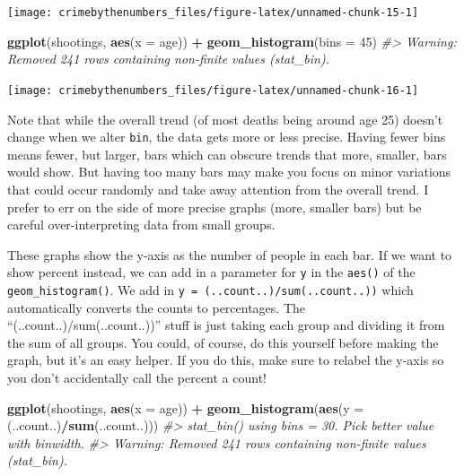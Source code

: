 \documentclass[
  12pt,
]{book}
\newenvironment{Shaded}{\begin{snugshade}}{\end{snugshade}}
\newcommand{\CommentTok}[1]{\textcolor[rgb]{0.37,0.37,0.37}{\textit{#1}}}
\newcommand{\DataTypeTok}[1]{\textcolor[rgb]{0.27,0.27,0.27}{#1}}
\newcommand{\DecValTok}[1]{\textcolor[rgb]{0.06,0.06,0.06}{#1}}
\newcommand{\KeywordTok}[1]{\textcolor[rgb]{0.27,0.27,0.27}{\textbf{#1}}}
\newcommand{\NormalTok}[1]{#1}
\newcommand{\OperatorTok}[1]{\textcolor[rgb]{0.43,0.43,0.43}{\textbf{#1}}}
\newcommand{\StringTok}[1]{\textcolor[rgb]{0.5,0.5,0.5}{#1}}
\begin{document}
\begin{center}\texttt{[image: crimebythenumbers\_files/figure-latex/unnamed-chunk-15-1]} \end{center}

\begin{Shaded}
\begin{Highlighting}[]
\KeywordTok{ggplot}\NormalTok{(shootings, }\KeywordTok{aes}\NormalTok{(}\DataTypeTok{x =}\NormalTok{ age)) }\OperatorTok{+}\StringTok{ }
\StringTok{  }\KeywordTok{geom\_histogram}\NormalTok{(}\DataTypeTok{bins =} \DecValTok{45}\NormalTok{)}
\CommentTok{\#> Warning: Removed 241 rows containing non{-}finite values (stat\_bin).}
\end{Highlighting}
\end{Shaded}

\begin{center}\texttt{[image: crimebythenumbers\_files/figure-latex/unnamed-chunk-16-1]} \end{center}

Note that while the overall trend (of most deaths being around age 25) doesn't change when we alter \texttt{bin}, the data gets more or less precise. Having fewer bins means fewer, but larger, bars which can obscure trends that more, smaller, bars would show. But having too many bars may make you focus on minor variations that could occur randomly and take away attention from the overall trend. I prefer to err on the side of more precise graphs (more, smaller bars) but be careful over-interpreting data from small groups.

These graphs show the y-axis as the number of people in each bar. If we want to show percent instead, we can add in a parameter for \texttt{y} in the \texttt{aes()} of the \texttt{geom\_histogram()}. We add in \texttt{y\ =\ (..count..)/sum(..count..))} which automatically converts the counts to percentages. The ``(..count..)/sum(..count..))'' stuff is just taking each group and dividing it from the sum of all groups. You could, of course, do this yourself before making the graph, but it's an easy helper. If you do this, make sure to relabel the y-axis so you don't accidentally call the percent a count!

\begin{Shaded}
\begin{Highlighting}[]
\KeywordTok{ggplot}\NormalTok{(shootings, }\KeywordTok{aes}\NormalTok{(}\DataTypeTok{x =}\NormalTok{ age)) }\OperatorTok{+}\StringTok{ }
\StringTok{  }\KeywordTok{geom\_histogram}\NormalTok{(}\KeywordTok{aes}\NormalTok{(}\DataTypeTok{y =}\NormalTok{ (..count..)}\OperatorTok{/}\KeywordTok{sum}\NormalTok{(..count..)))}
\CommentTok{\#> \textasciigrave{}stat\_bin()\textasciigrave{} using \textasciigrave{}bins = 30\textasciigrave{}. Pick better value with \textasciigrave{}binwidth\textasciigrave{}.}
\CommentTok{\#> Warning: Removed 241 rows containing non{-}finite values (stat\_bin).}
\end{Highlighting}
\end{Shaded}
\end{document}
